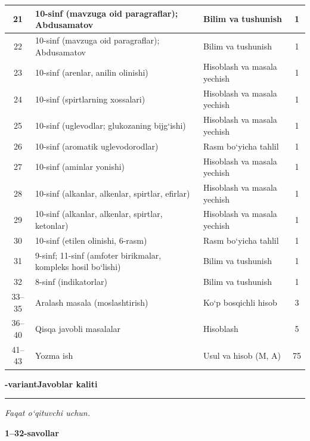 \documentclass[11pt,a4paper]{article}
\newcommand{\hdrpill}[1]{\begin{tikzpicture}[baseline=0pt]\node[fill=ygreen,text=white,rounded corners=8pt,inner xsep=10pt,inner ysep=5pt,font=\fontsize{13}{15}\bfseries\selectfont] at (0,0.475){#1};\end{tikzpicture}}
\newcommand{\curvar}{}\fancyhead[R]{\hdrpill{\curvar}}
\begin{document}
{\begin{longtable}{|c|p{7.2cm}|p{5.4cm}|c|}
21 & 10-sinf (mavzuga oid paragraflar); Abdusamatov & Bilim va tushunish & 1\\\hline
22 & 10-sinf (mavzuga oid paragraflar); Abdusamatov & Bilim va tushunish & 1\\\hline
23 & 10-sinf (arenlar, anilin olinishi) & Hisoblash va masala yechish & 1\\\hline
24 & 10-sinf (spirtlarning xossalari) & Hisoblash va masala yechish & 1\\\hline
25 & 10-sinf (uglevodlar; glukozaning bijg`ishi) & Hisoblash va masala yechish & 1\\\hline
26 & 10-sinf (aromatik uglevodorodlar) & Rasm bo`yicha tahlil & 1\\\hline
27 & 10-sinf (aminlar yonishi) & Hisoblash va masala yechish & 1\\\hline
28 & 10-sinf (alkanlar, alkenlar, spirtlar, efirlar) & Hisoblash va masala yechish & 1\\\hline
29 & 10-sinf (alkanlar, alkenlar, spirtlar, ketonlar) & Hisoblash va masala yechish & 1\\\hline
30 & 10-sinf (etilen olinishi, 6-rasm) & Rasm bo`yicha tahlil & 1\\\hline
31 & 9-sinf; 11-sinf (amfoter birikmalar, kompleks hosil bo`lishi) & Bilim va tushunish & 1\\\hline
32 & 8-sinf (indikatorlar) & Bilim va tushunish & 1\\\hline
33--35 & Aralash masala (moslashtirish) & Ko`p bosqichli hisob & 3\\\hline
36--40 & Qisqa javobli masalalar & Hisoblash & 5\\\hline
41--43 & Yozma ish & Usul va hisob (M, A) & 75\\\hline
\end{longtable}}
\renewcommand{\curvar}{Javoblar}
\newpage
\noindent\textbf{\fontsize{13}{15}-variant}\hfill \textbf{Javoblar kaliti}\par\smallskip\hrule\smallskip
\textit{Faqat o`qituvchi uchun.}\par\medskip
\noindent\textbf{1--32-savollar}\par\smallskip
\end{document}
